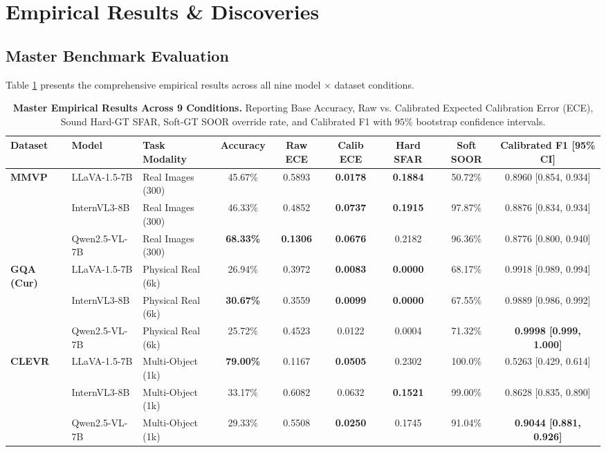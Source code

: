 \documentclass[10pt,twocolumn,letterpaper]{article}
\begin{document}
\section{Empirical Results \& Discoveries}

\subsection{Master Benchmark Evaluation}
Table \ref{tab:master_benchmark} presents the comprehensive empirical results across all nine model $\times$ dataset conditions.

\begin{table}[t]
\centering
\small
\caption{\textbf{Master Empirical Results Across 9 Conditions.} Reporting Base Accuracy, Raw vs. Calibrated Expected Calibration Error (ECE), Sound Hard-GT SFAR, Soft-GT SOOR override rate, and Calibrated F1 with $95\%$ bootstrap confidence intervals.}
\label{tab:master_benchmark}
\begin{tabular}{lllcccccc}
\toprule
\textbf{Dataset} & \textbf{Model} & \textbf{Task Modality} & \textbf{Accuracy} & \textbf{Raw ECE} & \textbf{Calib ECE} & \textbf{Hard SFAR} & \textbf{Soft SOOR} & \textbf{Calibrated F1 [95\% CI]} \\
\midrule
\multirow{3}{*}{\textbf{MMVP}} 
& LLaVA-1.5-7B & Real Images (300) & 45.67\% & 0.5893 & \textbf{0.0178} & \textbf{0.1884} & 50.72\% & 0.8960 [0.854, 0.934] \\
& InternVL3-8B & Real Images (300) & 46.33\% & 0.4852 & \textbf{0.0737} & \textbf{0.1915} & 97.87\% & 0.8876 [0.834, 0.934] \\
& Qwen2.5-VL-7B & Real Images (300) & \textbf{68.33\%} & \textbf{0.1306} & \textbf{0.0676} & 0.2182 & 96.36\% & 0.8776 [0.800, 0.940] \\
\midrule
\multirow{3}{*}{\textbf{GQA (Cur)}} 
& LLaVA-1.5-7B & Physical Real (6k) & 26.94\% & 0.3972 & \textbf{0.0083} & \textbf{0.0000} & 68.17\% & 0.9918 [0.989, 0.994] \\
& InternVL3-8B & Physical Real (6k) & \textbf{30.67\%} & 0.3559 & \textbf{0.0099} & \textbf{0.0000} & 67.55\% & 0.9889 [0.986, 0.992] \\
& Qwen2.5-VL-7B & Physical Real (6k) & 25.72\% & 0.4523 & 0.0122 & 0.0004 & 71.32\% & \textbf{0.9998 [0.999, 1.000]} \\
\midrule
\multirow{3}{*}{\textbf{CLEVR}} 
& LLaVA-1.5-7B & Multi-Object (1k) & \textbf{79.00\%} & 0.1167 & \textbf{0.0505} & 0.2302 & 100.0\% & 0.5263 [0.429, 0.614] \\
& InternVL3-8B & Multi-Object (1k) & 33.17\% & 0.6082 & 0.0632 & \textbf{0.1521} & 99.00\% & 0.8628 [0.835, 0.890] \\
& Qwen2.5-VL-7B & Multi-Object (1k) & 29.33\% & 0.5508 & \textbf{0.0250} & 0.1745 & 91.04\% & \textbf{0.9044 [0.881, 0.926]} \\
\bottomrule
\end{tabular}
\end{table}
\end{document}
